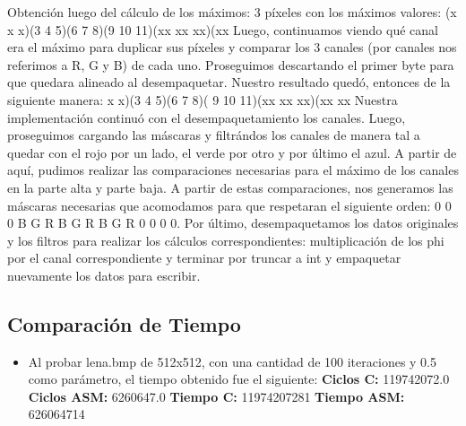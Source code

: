 \documentclass[10pt, a4paper]{article}
\begin{document}
\begin{itemize}
Obtención luego del cálculo de los máximos: 3 píxeles con los máximos valores:\newline
		(x x x)(3 4 5)(6  7  8)(9 10 11)(xx xx xx)(xx\newline
\newline
Luego, continuamos viendo qué canal era el máximo para duplicar sus píxeles y comparar los 3 canales (por canales nos referimos a R, G y B) de cada uno. Proseguimos descartando el primer byte para que quedara alineado al desempaquetar. Nuestro resultado quedó, entonces de la siguiente manera:\newline
		x x)(3 4 5)(6  7  8)( 9 10 11)(xx xx xx)(xx xx\newline
		\newline
Nuestra implementación continuó con el desempaquetamiento los canales. Luego, proseguimos cargando las máscaras y filtrándos los canales de manera tal a quedar con el rojo por un lado, el verde por otro y por último el azul. A partir de aquí, pudimos realizar las comparaciones necesarias para el máximo de los canales en la parte alta y parte baja. A partir de estas comparaciones, nos generamos las máscaras necesarias que acomodamos para que respetaran el siguiente orden: 0 0 0 B G R B G R B G R 0 0 0 0.\newline
Por último, desempaquetamos los datos originales y los filtros para realizar los cálculos correspondientes: multiplicación de los phi por el canal correspondiente y terminar por truncar a int y empaquetar nuevamente los datos para escribir.
\subsection{Comparación de Tiempo}

\begin{itemize}
\item{Al probar lena.bmp de 512x512, con una cantidad de 100 iteraciones y 0.5 como parámetro, el tiempo obtenido fue el siguiente:\newline
\newline
\textbf{Ciclos C:}                  119742072.0\newline
\vspace{0.15cm}
\textbf{Ciclos ASM:}               6260647.0\newline
\textbf{Tiempo C:}                 11974207281\newline
\textbf{Tiempo ASM:}               626064714\newline}
\end{itemize}


\end{itemize}
\end{document}
